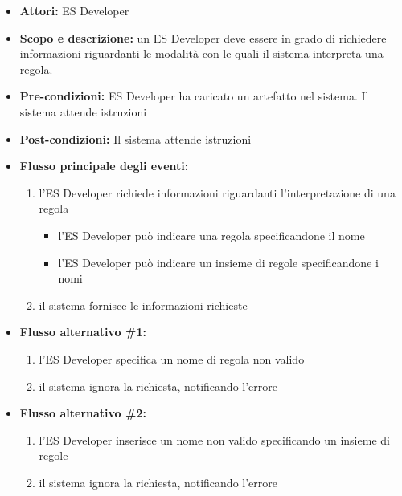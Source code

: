 \begin{itemize}
	\item \textbf{Attori:} ES Developer
	\item \textbf{Scopo e descrizione:} un ES Developer deve essere in grado di richiedere informazioni riguardanti le modalità con le quali il sistema interpreta una regola.
	\item \textbf{Pre-condizioni:} ES Developer ha caricato un artefatto nel sistema. Il sistema attende istruzioni
	\item \textbf{Post-condizioni:} Il sistema attende istruzioni
	\item \textbf{Flusso principale degli eventi:}
		\begin{enumerate}
			\item l'ES Developer richiede informazioni riguardanti l'interpretazione di una regola
			\begin{itemize}
				\item l'ES Developer può indicare una regola specificandone il nome
				\item l'ES Developer può indicare un insieme di regole specificandone i nomi
			\end{itemize}
			\item il sistema fornisce le informazioni richieste
		\end{enumerate}
	\item \textbf{Flusso alternativo \#1:}
		\begin{enumerate}
			\item l'ES Developer specifica un nome di regola non valido
			\item il sistema ignora la richiesta, notificando l'errore
		\end{enumerate}
	\item \textbf{Flusso alternativo \#2:}
		\begin{enumerate}
			\item l'ES Developer inserisce un nome non valido specificando un insieme di regole
			\item il sistema ignora la richiesta, notificando l'errore
		\end{enumerate}
\end{itemize}

